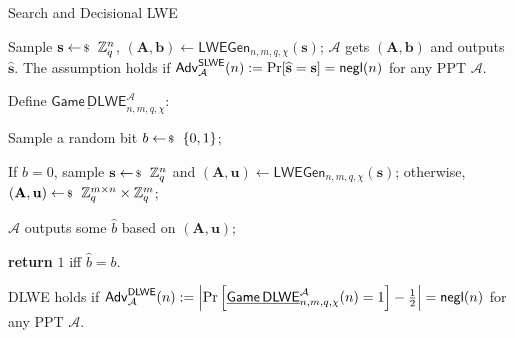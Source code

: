 \documentclass{zkdl-presentation-template}
\begin{document}
    \begin{frame}{Search and Decisional LWE}
        \begin{definition}
            Sample $\mathbf{s} \leftarrowS \mathbb{Z}_q^n$, $(\mathbf{A},\mathbf{b}) \gets \mathsf{LWEGen}_{n,m,q,\chi}(\mathbf{s})$; $\mathcal{A}$ gets $(\mathbf{A},\mathbf{b})$ and outputs $\widehat{\mathbf{s}}$. The assumption holds if $\mathsf{Adv}^{\mathsf{SLWE}}_{\mathcal{A}}(n) := \Pr[\widehat{\mathbf{s}} = \mathbf{s}] = \mathsf{negl}(n)$ for any PPT $\mathcal{A}$.
        \end{definition}
        \pause

        \begin{definition}
            Define $\underline{\mathsf{Game}\,\mathsf{DLWE}}^{\mathcal{A}}_{n,m,q,\chi}$:
            \begin{algoen}
                \item Sample a random bit $b \leftarrowS \{0,1\}$;
                \item If $b=0$, sample $\mathbf{s} \leftarrowS \mathbb{Z}_q^n$ and $(\mathbf{A},\mathbf{u}) \gets \mathsf{LWEGen}_{n,m,q,\chi}(\mathbf{s})$; otherwise, $(\mathbf{A},\mathbf{u}) \leftarrowS \mathbb{Z}_q^{m \times n} \times \mathbb{Z}_q^m$;
                \item $\mathcal{A}$ outputs some $\widehat{b}$ based on $(\mathbf{A},\mathbf{u})$;
                \item \textbf{return} $1$ iff $\widehat{b} = b$.
            \end{algoen}
            DLWE holds if $\mathsf{Adv}^{\mathsf{DLWE}}_{\mathcal{A}}(n) := \left|\Pr\left[\underline{\mathsf{Game}\,\mathsf{DLWE}}^{\mathcal{A}}_{n,m,q,\chi}(n) = 1\right] - \frac{1}{2}\right| = \mathsf{negl}(n)$ for any PPT $\mathcal{A}$.
        \end{definition}
    \end{frame}
\end{document}
